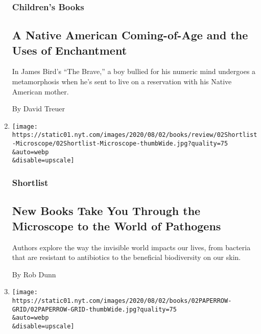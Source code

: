 \begin{enumerate}
  \hypertarget{childrens-books-3}{%
  \subsubsection{Children's Books}\label{childrens-books-3}}

  \hypertarget{a-native-american-coming-of-age-and-the-uses-of-enchantment}{%
  \subsection{A Native American Coming-of-Age and the Uses of
  Enchantment}\label{a-native-american-coming-of-age-and-the-uses-of-enchantment}}

  In James Bird's ``The Brave,'' a boy bullied for his numeric mind
  undergoes a metamorphosis when he's sent to live on a reservation with
  his Native American mother.

  By David Treuer
\item
  \href{/2020/07/31/books/review/biography-of-resistance-muhammad-zaman-clean-james-hamblin-the-sensitives-oliver-broudy.html}{}

  \texttt{[image: https://static01.nyt.com/images/2020/08/02/books/review/02Shortlist-Microscope/02Shortlist-Microscope-thumbWide.jpg?quality=75\\\&auto=webp\\\&disable=upscale]}

  \hypertarget{shortlist}{%
  \subsubsection{Shortlist}\label{shortlist}}

  \hypertarget{new-books-take-you-through-the-microscope-to-the-world-of-pathogens}{%
  \subsection{New Books Take You Through the Microscope to the World of
  Pathogens}\label{new-books-take-you-through-the-microscope-to-the-world-of-pathogens}}

  Authors explore the way the invisible world impacts our lives, from
  bacteria that are resistant to antibiotics to the beneficial
  biodiversity on our skin.

  By Rob Dunn
\item
  \href{/2020/07/31/books/review/new-paperbacks.html}{}

  \texttt{[image: https://static01.nyt.com/images/2020/08/02/books/02PAPERROW-GRID/02PAPERROW-GRID-thumbWide.jpg?quality=75\\\&auto=webp\\\&disable=upscale]}


\end{enumerate}
